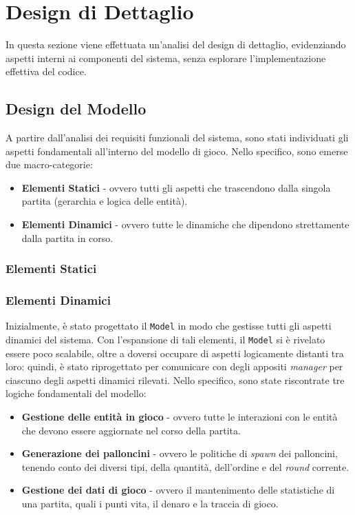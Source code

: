 \section{Design di Dettaglio}
In questa sezione viene effettuata un'analisi del design di dettaglio, evidenziando aspetti interni ai componenti del
sistema, senza esplorare l'implementazione effettiva del codice.

\subsection{Design del Modello}
A partire dall'analisi dei requisiti funzionali del sistema, sono stati individuati gli aspetti fondamentali all'interno
del modello di gioco. Nello specifico, sono emerse due macro-categorie:
\begin{itemize}
    \item \textbf{Elementi Statici} - ovvero tutti gli aspetti che trascendono dalla singola partita (gerarchia e logica 
    delle entità).
    \item \textbf{Elementi Dinamici} - ovvero tutte le dinamiche che dipendono strettamente dalla partita in corso.
\end{itemize}

\subsubsection{Elementi Statici}

\subsubsection{Elementi Dinamici}
Inizialmente, è stato progettato il \texttt{Model} in modo che gestisse tutti gli aspetti dinamici del sistema.
Con l'espansione di tali elementi, il \texttt{Model} si è rivelato essere poco scalabile, oltre a doversi occupare di
aspetti logicamente distanti tra loro: quindi, è stato riprogettato per comunicare con degli appositi \textit{manager}
per ciascuno degli aspetti dinamici rilevati. Nello specifico, sono state riscontrate tre logiche fondamentali del
modello:
\begin{itemize}
    \item \textbf{Gestione delle entità in gioco} - ovvero tutte le interazioni con le entità che devono essere
    aggiornate nel corso della partita.
    \item \textbf{Generazione dei palloncini} - ovvero le politiche di \textit{spawn} dei palloncini, tenendo conto dei
    diversi tipi, della quantità, dell'ordine e del \textit{round} corrente.
    \item \textbf{Gestione dei dati di gioco} - ovvero il mantenimento delle statistiche di una partita, quali i punti
    vita, il denaro e la traccia di gioco.
\end{itemize}

